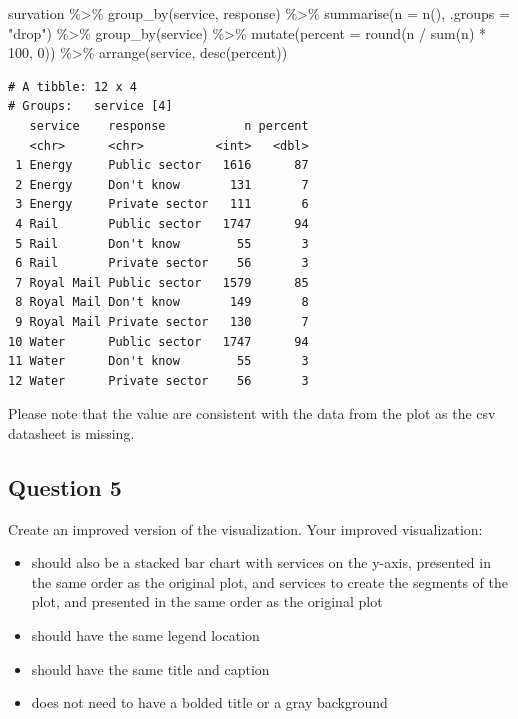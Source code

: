 \documentclass[
  letterpaper,
  DIV=11,
  numbers=noendperiod]{scrartcl}
\newenvironment{Shaded}{\begin{snugshade}}{\end{snugshade}}
\newcommand{\AttributeTok}[1]{\textcolor[rgb]{0.40,0.45,0.13}{#1}}
\newcommand{\DecValTok}[1]{\textcolor[rgb]{0.68,0.00,0.00}{#1}}
\newcommand{\FunctionTok}[1]{\textcolor[rgb]{0.28,0.35,0.67}{#1}}
\newcommand{\NormalTok}[1]{\textcolor[rgb]{0.00,0.23,0.31}{#1}}
\newcommand{\SpecialCharTok}[1]{\textcolor[rgb]{0.37,0.37,0.37}{#1}}
\newcommand{\StringTok}[1]{\textcolor[rgb]{0.13,0.47,0.30}{#1}}
\begin{document}
\begin{Shaded}
\begin{Highlighting}[]
\NormalTok{survation }\SpecialCharTok{\%\textgreater{}\%}
  \FunctionTok{group\_by}\NormalTok{(service, response) }\SpecialCharTok{\%\textgreater{}\%}
  \FunctionTok{summarise}\NormalTok{(}\AttributeTok{n =} \FunctionTok{n}\NormalTok{(), }\AttributeTok{.groups =} \StringTok{"drop"}\NormalTok{) }\SpecialCharTok{\%\textgreater{}\%}
  \FunctionTok{group\_by}\NormalTok{(service) }\SpecialCharTok{\%\textgreater{}\%}
  \FunctionTok{mutate}\NormalTok{(}\AttributeTok{percent =} \FunctionTok{round}\NormalTok{(n }\SpecialCharTok{/} \FunctionTok{sum}\NormalTok{(n) }\SpecialCharTok{*} \DecValTok{100}\NormalTok{, }\DecValTok{0}\NormalTok{)) }\SpecialCharTok{\%\textgreater{}\%}
  \FunctionTok{arrange}\NormalTok{(service, }\FunctionTok{desc}\NormalTok{(percent))}
\end{Highlighting}
\end{Shaded}

\begin{verbatim}
# A tibble: 12 x 4
# Groups:   service [4]
   service    response           n percent
   <chr>      <chr>          <int>   <dbl>
 1 Energy     Public sector   1616      87
 2 Energy     Don't know       131       7
 3 Energy     Private sector   111       6
 4 Rail       Public sector   1747      94
 5 Rail       Don't know        55       3
 6 Rail       Private sector    56       3
 7 Royal Mail Public sector   1579      85
 8 Royal Mail Don't know       149       8
 9 Royal Mail Private sector   130       7
10 Water      Public sector   1747      94
11 Water      Don't know        55       3
12 Water      Private sector    56       3
\end{verbatim}

Please note that the value are consistent with the data from the plot as
the csv datasheet is missing.

\subsection{Question 5}\label{question-5}

Create an improved version of the visualization. Your improved
visualization:

\begin{itemize}
\item
  should also be a stacked bar chart with services on the y-axis,
  presented in the same order as the original plot, and services to
  create the segments of the plot, and presented in the same order as
  the original plot
\item
  should have the same legend location
\item
  should have the same title and caption
\item
  does not need to have a bolded title or a gray background
\end{itemize}
\end{document}

